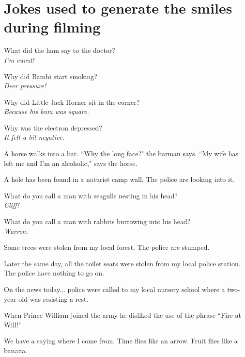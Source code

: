 \section{Jokes used to generate the smiles during filming}
\label{appa}

\begin{itemise}
\item What did the ham say to the doctor?\\
\textit{I'm cured!}
\item Why did Bambi start smoking?\\
\textit{Deer pressure!}
\item Why did Little Jack Horner sit in the corner?\\
\textit{Because his bum was square.}


\item Why was the electron depressed?\\
\textit{It felt a bit negative.}


\item A horse walks into a bar. ``Why the long face?" the barman says. ``My wife has left me and I'm an alcoholic," says the horse.


\item A hole has been found in a naturist camp wall. The police are looking into it.

\item What do you call a man with seagulls nesting in his head?\\
\textit{Cliff!}


\item What do you call a man with rabbits burrowing into his head?\\
\textit{Warren.}


\item Some trees were stolen from my local forest. The police are stumped.

\item Later the same day, all the toilet seats were stolen from my local police station. The police have nothing to go on.

\item On the news today... police were called to my local nursery school where a two-year-old was resisting a rest.


\item When Prince William joined the army he disliked the use of the phrase ``Fire at Will!"


\item We have a saying where I come from. Time flies like an arrow. Fruit flies like a banana.



\end{itemise}
